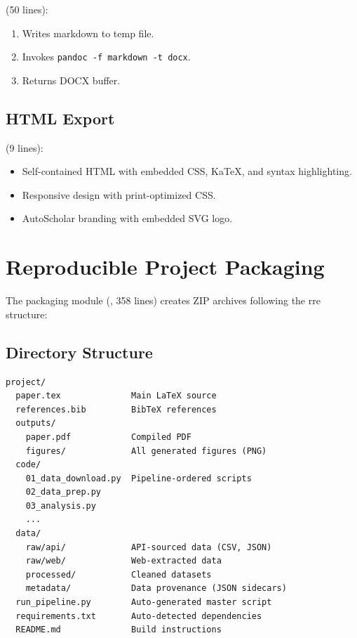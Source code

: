  (50 lines):
\begin{enumerate}
  \item Writes markdown to temp file.
  \item Invokes \texttt{pandoc -f markdown -t docx}.
  \item Returns DOCX buffer.
\end{enumerate}

\subsection{HTML Export}

 (9 lines):
\begin{itemize}
  \item Self-contained HTML with embedded CSS, KaTeX, and syntax highlighting.
  \item Responsive design with print-optimized CSS.
  \item AutoScholar branding with embedded SVG logo.
\end{itemize}

\section{Reproducible Project Packaging}
\label{sec:paper:packaging}

The packaging module (, 358 lines) creates ZIP archives following the \gls{rre} structure:

\subsection{Directory Structure}

\begin{verbatim}
project/
  paper.tex              Main LaTeX source
  references.bib         BibTeX references
  outputs/
    paper.pdf            Compiled PDF
    figures/             All generated figures (PNG)
  code/
    01_data_download.py  Pipeline-ordered scripts
    02_data_prep.py
    03_analysis.py
    ...
  data/
    raw/api/             API-sourced data (CSV, JSON)
    raw/web/             Web-extracted data
    processed/           Cleaned datasets
    metadata/            Data provenance (JSON sidecars)
  run_pipeline.py        Auto-generated master script
  requirements.txt       Auto-detected dependencies
  README.md              Build instructions
\end{verbatim}

